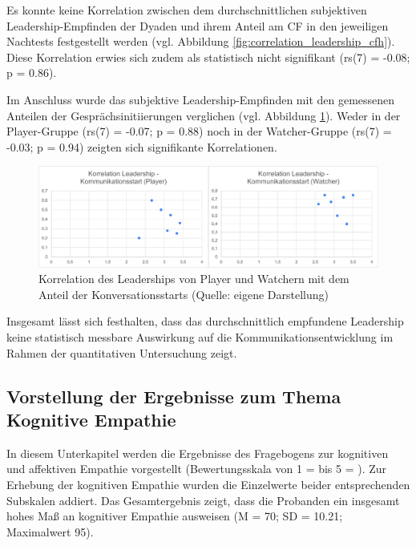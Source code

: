 Es konnte keine Korrelation  zwischen dem durchschnittlichen subjektiven Leadership-Empfinden der Dyaden und ihrem Anteil am \ac{CF} in den jeweiligen Nachtests festgestellt werden (vgl. Abbildung \ref{fig:correlation_leadership_cfh}). Diese Korrelation erwies sich zudem als statistisch nicht signifikant (rs(7) = -0.08; p = 0.86).

Im Anschluss wurde das subjektive Leadership-Empfinden mit den gemessenen Anteilen der Gesprächsinitiierungen verglichen (vgl. Abbildung \ref{fig:correlation_leadership_conversation_starts}). Weder in der Player-Gruppe  (rs(7) = -0.07; p = 0.88) noch in der Watcher-Gruppe (rs(7) = -0.03; p = 0.94) zeigten sich signifikante Korrelationen.

\begin{figure}[ht]
\centering
\includegraphics[width=1\linewidth]{content/pictures/Korrelation_Leaderhip_Start_of_conversation.png}
\caption{Korrelation des Leaderships von Player und Watchern mit dem Anteil der Konversationsstarts (Quelle: eigene Darstellung)}
\label{fig:correlation_leadership_conversation_starts}
\end{figure}

Insgesamt lässt sich festhalten, dass das durchschnittlich empfundene Leadership keine statistisch messbare Auswirkung auf die Kommunikationsentwicklung im Rahmen der quantitativen Untersuchung zeigt.

\subsection{Vorstellung der Ergebnisse zum Thema Kognitive Empathie}

In  diesem Unterkapitel werden die Ergebnisse des Fragebogens zur kognitiven und affektiven Empathie vorgestellt (Bewertungsskala von 1 =  bis 5 = ). Zur Erhebung der kognitiven Empathie wurden die Einzelwerte beider entsprechenden Subskalen addiert. Das Gesamtergebnis zeigt, dass die Probanden ein insgesamt hohes Maß an kognitiver Empathie ausweisen (M = 70; SD = 10.21; Maximalwert 95).

